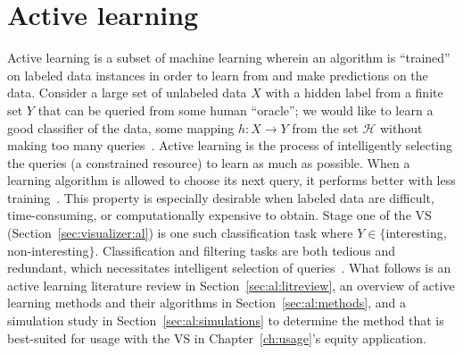 \chapter{Active learning \label{ch:al}}

Active learning is a subset of machine learning wherein an algorithm is 
``trained'' on labeled data instances in order to learn from and make 
predictions on the data.  Consider a large set of unlabeled data $X$ with a 
hidden label from a finite set $Y$ that can be queried from some human 
``oracle''; we would like to learn a good classifier of the data, some mapping 
$h: X \rightarrow Y$ from the set $\mathcal{H}$ without making too many 
queries~\cite{dasgupta2011}. Active learning is the process of intelligently 
selecting the queries (a constrained resource) to learn as much as possible. 
When a learning algorithm is allowed to choose its next query, it performs 
better with less training~\cite{settles2010}. This property is especially 
desirable when labeled data are difficult, time-consuming, or computationally 
expensive to obtain. Stage one of the VS (Section~\ref{sec:visualizer:al}) is 
one such classification task where $Y\in\{$interesting, non-interesting$\}$. 
Classification and filtering tasks are both tedious and redundant, which 
necessitates intelligent selection of queries~\cite{settles2010}. What follows 
is an active learning literature review in Section~\ref{sec:al:litreview}, an 
overview of active learning methods and their algorithms in 
Section~\ref{sec:al:methods}, and a simulation study in 
Section~\ref{sec:al:simulations} to determine the method that is best-suited 
for usage with the VS in Chapter~\ref{ch:usage}'s equity application.





%
%
